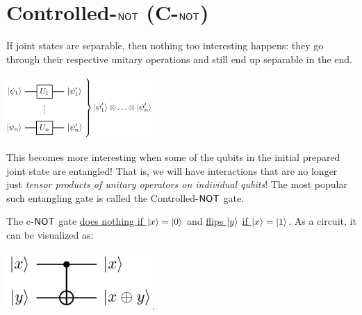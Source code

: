 \documentclass[12pt]{article}
\begin{document}
\section{Controlled-$\NOT$ (C-$\NOT$)}
If joint states are separable, then nothing too interesting happens: they go through their respective unitary operations and still end up separable in the end.

\begin{center}
    \includegraphics[width = 15em]{images/2.jpg}
\end{center}

\noindent This becomes more interesting when some of the qubits in the initial prepared joint state are entangled! That is, we will have interactions that are no longer just \textit{tensor products of unitary operators on individual qubits}! The most popular such entangling gate is called the Controlled-$\NOT$ gate.

\begin{definition}\label{def:c-not}
The c-$\NOT$ gate \underline{does nothing if $\Ket{x} = \Ket{0}$} and \underline{flips $\Ket{y}$} \underline{if $\Ket{x} = \Ket{1}$}. As a circuit, it can be visualized as:
\begin{center}
    \includegraphics[width = 15em]{images/3.jpg}.
\end{center}
\end{definition}
\end{document}
